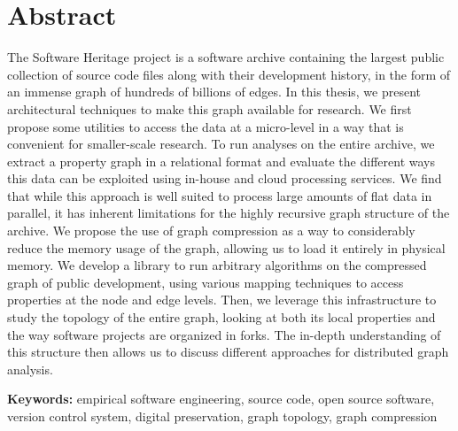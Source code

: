 \section*{Abstract}
\begin{SingleSpace}
    The Software Heritage project is a software archive containing the largest
    public collection of source code files along with their development history,
    in the form of an immense graph of hundreds of billions of edges. In this
    thesis, we present architectural techniques to make this graph available
    for research. We first propose some utilities to access the data at a
    micro-level in a way that is convenient for smaller-scale research.
    To run analyses on the entire archive, we extract a property graph in a
    relational format and evaluate the different ways this data can be
    exploited using in-house and cloud processing services.
    We find that while this approach is well suited to process large amounts of
    flat data in parallel, it has inherent limitations for the highly recursive
    graph structure of the archive. We propose the use of graph compression as
    a way to considerably reduce the memory usage of the graph, allowing us to
    load it entirely in physical memory. We develop a library to run arbitrary
    algorithms on the compressed graph of public development, using various
    mapping techniques to access properties at the node and edge levels.
    Then, we leverage this infrastructure to study the topology of the entire
    graph, looking at both its local properties and the way software projects
    are organized in forks. The in-depth understanding of this structure then
    allows us to discuss different approaches for distributed graph analysis.

\medskip

\textbf{Keywords:} empirical software engineering, source code, open source
software, version control system, digital preservation, graph topology, graph
compression

\end{SingleSpace}


